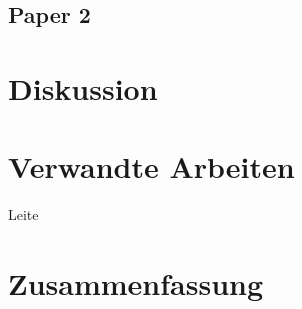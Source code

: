 \documentclass[conference,compsoc]{IEEEtran}
\begin{document}
\subsection{Paper 2}



\section{Diskussion}

\section{Verwandte Arbeiten}

Leite \cite{leite2013systematic}\\


\section{Zusammenfassung}



%
%







%
%
%









\end{document}
